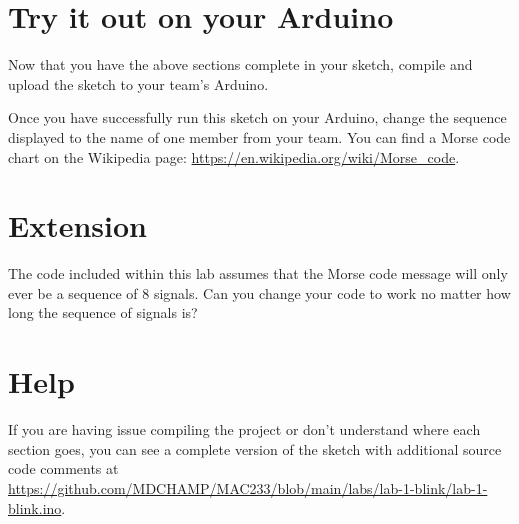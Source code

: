 \documentclass[11pt,a4paper]{article}
\begin{document}
\section{Try it out on your Arduino}
Now that you have the above sections complete in your sketch, compile and upload the sketch to your team's Arduino.

Once you have successfully run this sketch on your Arduino, change the sequence displayed to the name of one member from your team. You can find a Morse code chart on the Wikipedia page: \url{https://en.wikipedia.org/wiki/Morse_code}.

\section{Extension}
The code included within this lab assumes that the Morse code message will only ever be a sequence of 8 signals. Can you change your code to work no matter how long the sequence of signals is?

\pagebreak
\section*{Help}
If you are having issue compiling the project or don't understand where each section goes, you can see a complete version of the sketch with additional source code comments at \url{https://github.com/MDCHAMP/MAC233/blob/main/labs/lab-1-blink/lab-1-blink.ino}.

\vspace{2em}

\begin{center}
\end{center}
\end{document}
